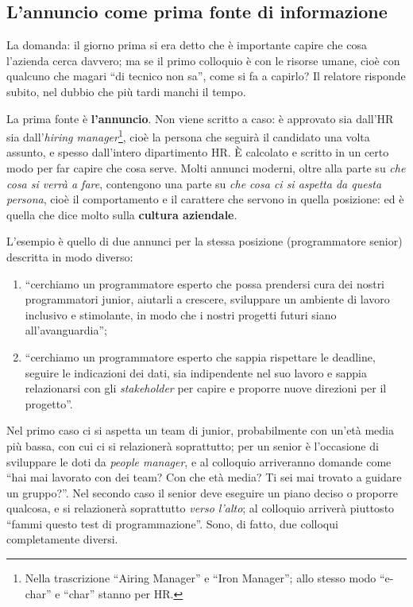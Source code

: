 \subsection{L'annuncio come prima fonte di informazione}

La domanda: il giorno prima si era detto che è importante capire che cosa
l'azienda cerca davvero; ma se il primo colloquio è con le risorse umane, cioè
con qualcuno che magari ``di tecnico non sa'', come si fa a capirlo? Il
relatore risponde subito, nel dubbio che più tardi manchi il tempo.

La prima fonte è \textbf{l'annuncio}. Non viene scritto a caso: è approvato
sia dall'HR sia dall'\emph{hiring manager}\footnote{Nella trascrizione
``Airing Manager'' e ``Iron Manager''; allo stesso modo ``e-char'' e ``char''
stanno per HR.}, cioè la persona che seguirà il candidato una volta assunto,
e spesso dall'intero dipartimento HR. È calcolato e scritto in un certo modo
per far capire che cosa serve. Molti annunci moderni, oltre alla parte su
\emph{che cosa si verrà a fare}, contengono una parte su \emph{che cosa ci si
aspetta da questa persona}, cioè il comportamento e il carattere che servono
in quella posizione: ed è quella che dice molto sulla \textbf{cultura
aziendale}.

L'esempio è quello di due annunci per la stessa posizione (programmatore
senior) descritta in modo diverso:
\begin{enumerate}
  \item ``cerchiamo un programmatore esperto che possa prendersi cura dei
        nostri programmatori junior, aiutarli a crescere, sviluppare un
        ambiente di lavoro inclusivo e stimolante, in modo che i nostri
        progetti futuri siano all'avanguardia'';
  \item ``cerchiamo un programmatore esperto che sappia rispettare le
        deadline, seguire le indicazioni dei dati, sia indipendente nel suo
        lavoro e sappia relazionarsi con gli \emph{stakeholder} per capire e
        proporre nuove direzioni per il progetto''.
\end{enumerate}
Nel primo caso ci si aspetta un team di junior, probabilmente con un'età media
più bassa, con cui ci si relazionerà soprattutto; per un senior è l'occasione
di sviluppare le doti da \emph{people manager}, e al colloquio arriveranno
domande come ``hai mai lavorato con dei team? Con che età media? Ti sei mai
trovato a guidare un gruppo?''. Nel secondo caso il senior deve eseguire un
piano deciso o proporre qualcosa, e si relazionerà soprattutto \emph{verso
l'alto}; al colloquio arriverà piuttosto ``fammi questo test di
programmazione''. Sono, di fatto, due colloqui completamente diversi.

